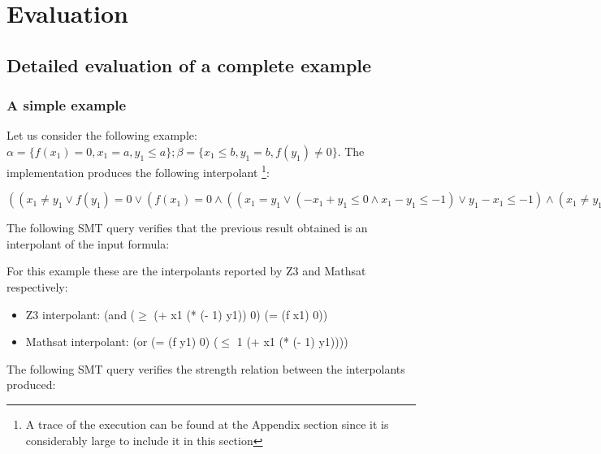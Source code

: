 \section{Evaluation}

\subsection{Detailed evaluation of a complete example}

\subsubsection{A simple example}

Let us consider the following example: 
$\alpha = \{ f(x_1) = 0, x_1 = a, y_1 \leq a\}; 
\beta = \{x_1 \leq b, y_1 = b, f(y_1) \neq 0\}$.
The implementation produces the following interpolant \footnote{A trace of the
  execution can be found at the Appendix section since it is considerably
large to include it in this section}: 
  
$((x_1 \neq y_1 \lor f(y_1) = 0 \lor (f(x_1) = 0 \land ((x_1 = y_1 \lor ( -x_1 + y_1 \leq 0 \land x_1 - y_1 \leq -1) \lor y_1 - x_1 \leq -1) \land (x_1 \neq y_1)))) \land (x_1 = y_1 \lor (((x_1 = y_1) \lor (-x_1 + y_1 \leq 0 \land x_1 - y_1 \leq -1) \lor y_1 - x_1 \leq -1) \land x_1 \neq y_1)))$


%

The following SMT query verifies that the previous result obtained is 
an interpolant of the input formula:



For this example these are the interpolants reported by Z3 and Mathsat
respectively:

\begin{itemize}
  \item Z3 interpolant: (and ($\geq$ (+ x1 (* (- 1) y1)) 0) (= (f x1) 0))
  \item Mathsat interpolant: (or (= (f y1) 0) ($\leq$ 1 (+ x1 (* (- 1) y1))))
\end{itemize}

The following SMT query verifies the strength relation between the interpolants produced:





